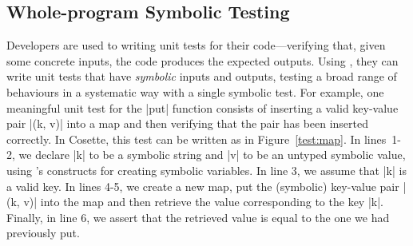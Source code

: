 

\subsection{Whole-program Symbolic Testing}
\label{subsec:st}

Developers are used to writing unit tests for their code---verifying that, given some concrete inputs, the code produces the expected outputs. Using \cosette, they can write unit tests that have \emph{symbolic} inputs and outputs, testing a broad range of behaviours in a systematic way with a single symbolic test. For example, one meaningful unit test for the \jsinline|put| function consists of inserting a valid key-value pair \jsinline|(k, v)| into a map and then verifying that the pair has been inserted correctly. In Cosette, this test can be written as in Figure~\ref{test:map}. In lines~1-2, we declare \jsinline|k| to be a symbolic string and \jsinline|v| to be an untyped symbolic value, using \cosette's constructs for creating symbolic variables. In line 3, we assume that \jsinline|k| is a valid key. In lines 4-5, we create a new map, put the (symbolic) key-value pair \jsinline|(k, v)| into the map and then retrieve the value corresponding to the key \jsinline|k|. Finally, in line 6, we assert that the retrieved value is equal to the one we had previously put.

